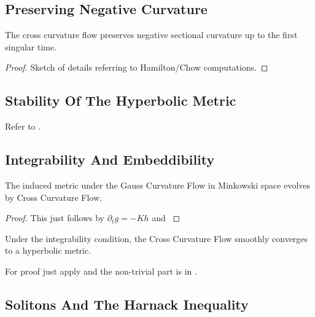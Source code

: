 \documentclass[a4paper, 12pt]{amsart}
\begin{document}
\subsection{Preserving Negative Curvature}
\label{subsec:xcf_preserving}

\begin{lemma}
The cross curvature flow preserves negative sectional curvature up to the first singular time.
\end{lemma}

\begin{proof}
{\color{red} Sketch of details referring to Hamilton/Chow computations.}
\end{proof}

\subsection{Stability Of The Hyperbolic Metric}
\label{subsec:xcf_stability}

{\color{red} Refer to \cite{MR2448593}.}

\subsection{Integrability And Embeddibility}
\label{subsec:xcf_gcf}

\begin{lemma}
\label{lem:xcf_gcf}

The induced metric under the Gauss Curvature Flow in Minkowski space evolves by Cross Curvature Flow.
\end{lemma}

\begin{proof}
{\color{red} This just follows by \(\partial_t g = -K h\) and }
\end{proof}

\begin{thm}
\label{thm:xcf_integrable_convergence}

Under the integrability condition, the Cross Curvature Flow smoothly converges to a hyperbolic metric.
\end{thm}

{\color{red}For proof just apply  and the non-trivial part is in \cite{MR3344442}.}

\subsection{Solitons And The Harnack Inequality}
\label{subsec:xcf_solitons}
\end{document}
